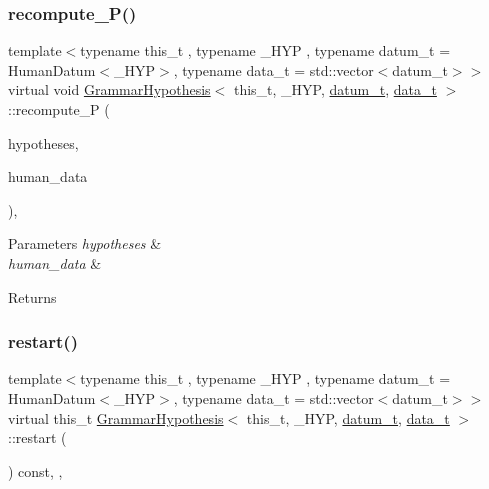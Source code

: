 \subsubsection{\texorpdfstring{recompute\+\_\+\+P()}{recompute\_P()}}
{\footnotesize\ttfamily template$<$typename this\+\_\+t , typename \+\_\+\+H\+YP , typename datum\+\_\+t  = Human\+Datum$<$\+\_\+\+H\+Y\+P$>$, typename data\+\_\+t  = std\+::vector$<$datum\+\_\+t$>$$>$ \\
virtual void \hyperlink{class_grammar_hypothesis}{Grammar\+Hypothesis}$<$ this\+\_\+t, \+\_\+\+H\+YP, \hyperlink{class_bayesable_a9f1a6c0cd7855550fa10b1a8f13a5867}{datum\+\_\+t}, \hyperlink{class_bayesable_aa2788c4d7718c0a824e1d28c4c98f921}{data\+\_\+t} $>$\+::recompute\+\_\+P (\begin{DoxyParamCaption}\item[{std\+::vector$<$ \hyperlink{class_grammar_hypothesis_a28fc99df28de741179719c94ecd77699}{H\+YP} $>$ \&}]{hypotheses,  }\item[{const \hyperlink{class_bayesable_aa2788c4d7718c0a824e1d28c4c98f921}{data\+\_\+t} \&}]{human\+\_\+data }\end{DoxyParamCaption})\hspace{0.3cm}{\ttfamily [inline]}, {\ttfamily [virtual]}}


\begin{DoxyParams}{Parameters}
{\em hypotheses} & \\
\hline
{\em human\+\_\+data} & \\
\hline
\end{DoxyParams}
\begin{DoxyReturn}{Returns}

\end{DoxyReturn}
\mbox{\label{class_grammar_hypothesis_a85c5aad5990900d4da6eca5a24deb3e6}} 
\subsubsection{\texorpdfstring{restart()}{restart()}}
{\footnotesize\ttfamily template$<$typename this\+\_\+t , typename \+\_\+\+H\+YP , typename datum\+\_\+t  = Human\+Datum$<$\+\_\+\+H\+Y\+P$>$, typename data\+\_\+t  = std\+::vector$<$datum\+\_\+t$>$$>$ \\
virtual this\+\_\+t \hyperlink{class_grammar_hypothesis}{Grammar\+Hypothesis}$<$ this\+\_\+t, \+\_\+\+H\+YP, \hyperlink{class_bayesable_a9f1a6c0cd7855550fa10b1a8f13a5867}{datum\+\_\+t}, \hyperlink{class_bayesable_aa2788c4d7718c0a824e1d28c4c98f921}{data\+\_\+t} $>$\+::restart (\begin{DoxyParamCaption}{ }\end{DoxyParamCaption}) const\hspace{0.3cm}{\ttfamily [inline]}, {\ttfamily [override]}, {\ttfamily [virtual]}}



